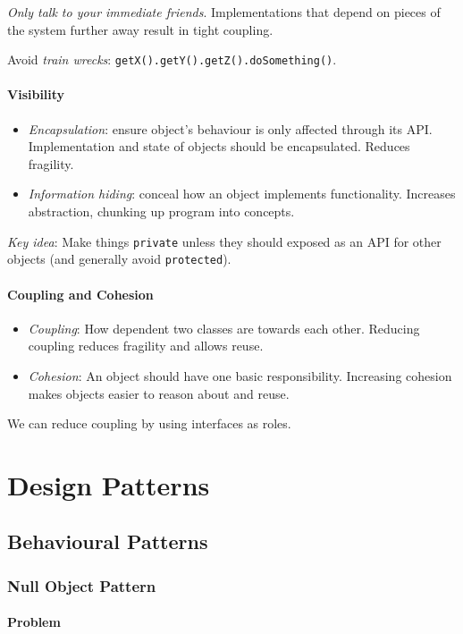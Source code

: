\documentclass[twocolumn,english]{article}
\begin{document}
\emph{Only talk to your immediate friends}. Implementations that depend
on pieces of the system further away result in tight coupling.

Avoid \emph{train wrecks}: \texttt{getX().getY().getZ().doSomething()}.

\paragraph{Visibility}
\begin{itemize}
\item \emph{Encapsulation}: ensure object's behaviour is only affected through
its API. Implementation and state of objects should be encapsulated.
Reduces fragility.
\item \emph{Information hiding}: conceal how an object implements functionality.
Increases abstraction, chunking up program into concepts.
\end{itemize}
\emph{Key idea}: Make things \texttt{private} unless they should exposed
as an API for other objects (and generally avoid \texttt{protected}).

\paragraph{Coupling and Cohesion}
\begin{itemize}
\item \emph{Coupling}: How dependent two classes are towards each other.
Reducing coupling reduces fragility and allows reuse.
\item \emph{Cohesion}: An object should have one basic responsibility. Increasing
cohesion makes objects easier to reason about and reuse.
\end{itemize}
We can reduce coupling by using interfaces as roles.

\section{Design Patterns}

\subsection{Behavioural Patterns}

\subsubsection{Null Object Pattern}

\paragraph{Problem}
\end{document}
